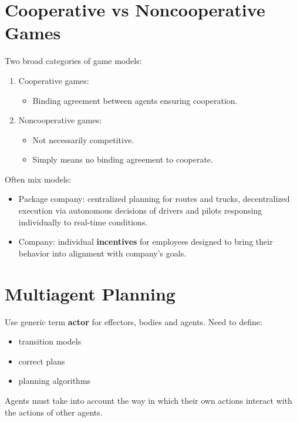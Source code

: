 \documentclass[11pt]{article}
\begin{document}
\section{Cooperative vs Noncooperative Games}
\label{sec:org94898b9}

Two broad categories of game models:

\begin{enumerate}
\item Cooperative games:

\begin{itemize}
\item Binding agreement between agents ensuring cooperation.
\end{itemize}

\item Noncooperative games:

\begin{itemize}
\item Not necessarily competitive.
\item Simply means no binding agreement to cooperate.
\end{itemize}
\end{enumerate}

Often mix models:

\begin{itemize}
\item Package company: centralized planning for routes and trucks, decentralized execution via autonomous decisions of drivers and pilots responsing individually to real-time conditions.
\item Company: individual \textbf{incentives} for employees designed to bring their behavior into alignment with company's goals.
\end{itemize}
\section{Multiagent Planning}
\label{sec:orgd08f4e4}

Use generic term \textbf{actor} for effectors, bodies and agents.  Need to define:

\begin{itemize}
\item transition models
\item correct plans
\item planning algorithms
\end{itemize}

Agents must take into account the way in which their own actions interact with the actions of other agents.
\end{document}
